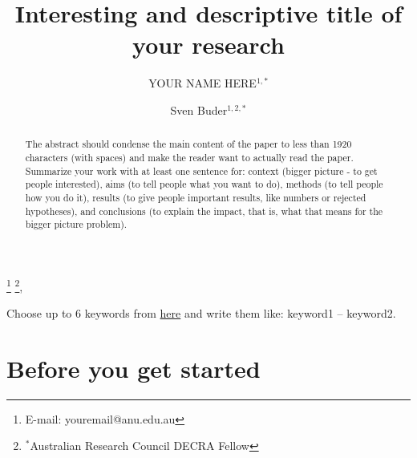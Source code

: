 \documentclass[twocolumn,apj,numberedappendix,appendixfloats]{openjournal}
\begin{document}
\title{Interesting and descriptive title of your research}

\author{\vspace{-1.5cm}YOUR NAME HERE$^{1,*}$}
\author{Sven Buder$^{1,2,*}$}




\thanks{E-mail: youremail@anu.edu.au}
\thanks{$^*$Australian Research Council DECRA Fellow},

\begin{abstract}
The abstract should condense the main content of the paper to less than 1920 characters (with spaces) and make the reader want to actually read the paper. Summarize your work with at least one sentence for: context (bigger picture - to get people interested), aims (to tell people what you want to do), methods (to tell people how you do it), results (to give people important results, like numbers or rejected hypotheses), and conclusions (to explain the impact, that is, what that means for the bigger picture problem).
\end{abstract}

\begin{keywords}
    {Choose up to 6 keywords from \href{https://academic.oup.com/DocumentLibrary/mnras/keywords.pdf}{here} and write them like: keyword1 -- keyword2.}
\end{keywords}

\maketitle

\section{Before you get started}
\end{document}
